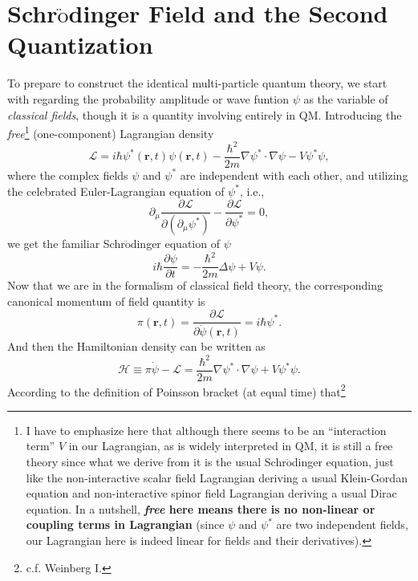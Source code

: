 \documentclass[b5paper,10pt,UTF8]{book}
\numberwithin{equation}{section}
\begin{document}
	\section{Schr$\ddot{\text{o}}$dinger Field and the Second Quantization}
		\indent To prepare to construct the identical multi-particle quantum theory, we start with regarding the probability amplitude or wave funtion $\psi$ as the variable of \emph{classical fields}, though it is a quantity involving entirely in QM. Introducing the \emph{free}\footnote{I have to emphasize here that although there seems to be an ``interaction term'' $V$ in our Lagrangian, as is widely interpreted in QM, it is still a free theory since what we derive from it is the usual Schr$\ddot{\text{o}}$dinger equation, just like the non-interactive scalar field Lagrangian deriving a usual Klein-Gordan equation and non-interactive spinor field Lagrangian deriving a usual Dirac equation. In a nutshell, \textbf{\emph{free} here means there is no non-linear or coupling terms in Lagrangian} (since $\psi$ and $\psi^*$ are two independent fields, our Lagrangian here is indeed linear for fields and their derivatives).} (one-component) Lagrangian density
		\begin{equation}\label{1.2.1}
			\mathcal{L}=i\hbar\psi^*(\bm{r},t)\psi(\bm{r},t)-\dfrac{\hbar^2}{2m}\nabla\psi^*\cdot\nabla\psi-V\psi^*\psi,
		\end{equation}
		where the complex fields $\psi$ and $\psi^*$ are independent with each other, and utilizing the celebrated Euler-Lagrangian equation of $\psi^*$, i.e.,
		$$\partial_\mu\dfrac{\partial\mathcal{L}}{\partial(\partial_\mu\psi^*)}-\dfrac{\partial\mathcal{L}}{\partial\psi^*}=0,$$
		we get the familiar Schr$\ddot{\text{o}}$dinger equation of $\psi$
		$$i\hbar\dfrac{\partial \psi}{\partial t}=-\dfrac{\hbar^2}{2m}\Delta\psi+V\psi.$$
		\indent Now that we are in the formalism of classical field theory, the corresponding canonical momentum of field quantity is
		\begin{equation}\label{1.2.2}
			\pi(\bm{r},t)=\dfrac{\partial\mathcal{L}}{\partial\dot{\psi}(\bm{r},t)}=i\hbar\psi^*.
		\end{equation}
		And then the Hamiltonian density can be written as
		\begin{equation}\label{1.2.3}
			\mathcal{H}\equiv \pi\dot{\psi}-\mathcal{L}=\dfrac{\hbar^2}{2m}\nabla\psi^*\cdot\nabla\psi+V\psi^*\psi.
		\end{equation}
		\indent According to the definition of Poinsson bracket (at equal time) that\footnote{c.f. Weinberg I.}
\end{document}

